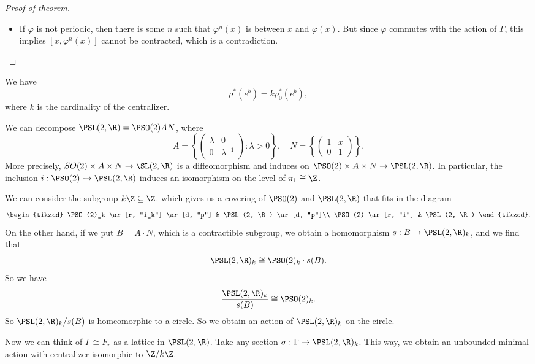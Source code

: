 \documentclass[a4paper]{article}
\newcommand\Free{F}
\begin{document}
\begin{proof}[Proof of theorem]
\begin{itemize}
    \item If $\varphi$ is not periodic, then there is some $n$ such that $\varphi^n(x)$ is between $x$ and $\varphi(x)$. But since $\varphi$ commutes with the action of $\Gamma$, this implies $[x, \varphi^n(x)]$ cannot be contracted, which is a contradiction.
  \end{itemize}
\end{proof}

\begin{ex}
  We have
  \[
    \rho^*(e^b) = k \rho^*_0(e^b),
  \]
  where $k$ is the cardinality of the centralizer.
\end{ex}

\begin{eg}
  We can decompose $\PSL(2, \R) = \PSO(2) AN$, where
  \[
    A = \left\{
      \begin{pmatrix}
        \lambda & 0\\
        0 & \lambda^{-1}
      \end{pmatrix}: \lambda > 0
    \right\},\quad N = \left\{
      \begin{pmatrix}
        1 & x\\
        0 & 1
      \end{pmatrix}
    \right\}.
  \]
  More precisely, $SO(2) \times A \times N \to \SL(2, \R)$ is a diffeomorphism and induces on $\PSO(2)\times A \times N \to \PSL(2, \R)$. In particular, the inclusion $i: \PSO(2) \hookrightarrow \PSL(2, \R)$ induces an isomorphism on the level of $\pi_1 \cong \Z$.

  We can consider the subgroup $k\Z \subseteq \Z$. which gives us a covering of $\PSO(2)$ and $\PSL(2, \R)$ that fits in the diagram
  \[
    \begin{tikzcd}
      \PSO(2)_k \ar[r, "i_k"] \ar[d, "p"] & \PSL(2, \R) \ar[d, "p"]\\
      \PSO(2) \ar[r, "i"] & \PSL(2, \R)
    \end{tikzcd}.
  \]
  On the other hand, if we put $B = A \cdot N$, which is a contractible subgroup, we obtain a homomorphism $s: B \to \PSL(2, \R)_k$, and we find that
  \[
    \PSL(2, \R)_k \cong \PSO(2)_k \cdot s(B).
  \]
  So we have
  \[
    \frac{\PSL(2, \R)_k}{ s(B)} \cong \PSO(2)_k.
  \]
  So $\PSL(2, \R)_k/s(B)$ is homeomorphic to a circle. So we obtain an action of $\PSL(2, \R)_k$ on the circle. %

  Now we can think of $\Gamma \cong \Free_r$ as a lattice in $\PSL(2, \R)$. Take any section $\sigma: \Gamma \to \PSL(2, \R)_k$. This way, we obtain an unbounded minimal action with centralizer isomorphic to $\Z/k\Z$.
\end{eg}
\end{document}
